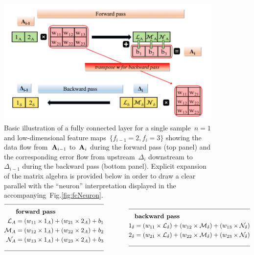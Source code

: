 \documentclass{article}
\begin{document}
\begin{figure}
\captionsetup{singlelinecheck=false}
\centering
\includegraphics[width=0.89\linewidth]{pptx/fc/Slide1.png}
\caption[]{Basic illustration of a fully connected layer for a single sample~$n=1$ and low-dimensional feature maps~$\{ f_{i-1} = 2 , f_i = 3 \}$ showing the data flow from~${\bf A}_{i-1}$ to~${\bf A}_i$ during the forward pass (top panel) and the corresponding error flow from upstream~$\Delta_i$ downstream to~$\Delta_{i-1}$ during the backward pass (bottom panel).  Explicit expansion of the matrix algebra is provided below in order to draw a clear parallel with the ``neuron'' interpretation displayed in the accompanying~Fig.\ref{fig:fcNeuron}.
\begin{equation*}
\begin{aligned}[c]
\cline{1-2}
& \text{\bf forward pass} \\
\mathcal{L}_A &= (w_{11} \times 1_A) + (w_{21} \times 2_A) + b_1 \\
\mathcal{M}_A &= (w_{12} \times 1_A) + (w_{22} \times 2_A) + b_2 \\
\mathcal{N}_A &= (w_{13} \times 1_A) + (w_{23} \times 2_A) + b_3 \\
\cline{1-2}
\end{aligned}
\qquad \qquad
\begin{aligned}[c]
\cline{1-2}
& \text{\bf backward pass} \\
1_\delta &= (w_{11} \times \mathcal{L}_\delta) + (w_{12} \times \mathcal{M}_\delta) + (w_{13} \times \mathcal{N}_\delta) \\
2_\delta &= (w_{21} \times \mathcal{L}_\delta) + (w_{22} \times \mathcal{M}_\delta) + (w_{23} \times \mathcal{N}_\delta) \\
\cline{1-2}
\end{aligned}
\end{equation*}
}
\label{fig:fcMatrix}
\end{figure}
\end{document}
